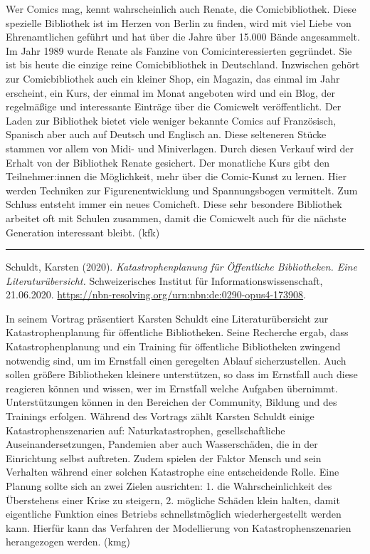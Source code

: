 \documentclass[a4paper,
fontsize=11pt,
oneside,
numbers=noperiodatend,
parskip=half-,
bibliography=totoc,
final
]{scrartcl}
\begin{document}
Wer Comics mag, kennt wahrscheinlich auch Renate, die Comicbibliothek.
Diese spezielle Bibliothek ist im Herzen von Berlin zu finden, wird mit
viel Liebe von Ehrenamtlichen geführt und hat über die Jahre über 15.000
Bände angesammelt. Im Jahr 1989 wurde Renate als Fanzine von
Comicinteressierten gegründet. Sie ist bis heute die einzige reine
Comicbibliothek in Deutschland. Inzwischen gehört zur Comicbibliothek
auch ein kleiner Shop, ein Magazin, das einmal im Jahr erscheint, ein
Kurs, der einmal im Monat angeboten wird und ein Blog, der regelmäßige
und interessante Einträge über die Comicwelt veröffentlicht. Der Laden
zur Bibliothek bietet viele weniger bekannte Comics auf Französisch,
Spanisch aber auch auf Deutsch und Englisch an. Diese selteneren Stücke
stammen vor allem von Midi- und Miniverlagen. Durch diesen Verkauf wird
der Erhalt von der Bibliothek Renate gesichert. Der monatliche Kurs gibt
den Teilnehmer:innen die Möglichkeit, mehr über die Comic-Kunst zu
lernen. Hier werden Techniken zur Figurenentwicklung und Spannungsbogen
vermittelt. Zum Schluss entsteht immer ein neues Comicheft. Diese sehr
besondere Bibliothek arbeitet oft mit Schulen zusammen, damit die
Comicwelt auch für die nächste Generation interessant bleibt. (kfk)

\begin{center}\rule{0.5\linewidth}{0.5pt}\end{center}

Schuldt, Karsten (2020). \emph{Katastrophenplanung für Öffentliche
Bibliotheken. Eine Literaturübersicht.} Schweizerisches Institut für
Informationswissenschaft, 21.06.2020.
\url{https://nbn-resolving.org/urn:nbn:de:0290-opus4-173908}.

In seinem Vortrag präsentiert Karsten Schuldt eine Literaturübersicht
zur Katastrophenplanung für öffentliche Bibliotheken. Seine Recherche
ergab, dass Katastrophenplanung und ein Training für öffentliche
Bibliotheken zwingend notwendig sind, um im Ernstfall einen geregelten
Ablauf sicherzustellen. Auch sollen größere Bibliotheken kleinere
unterstützen, so dass im Ernstfall auch diese reagieren können und
wissen, wer im Ernstfall welche Aufgaben übernimmt. Unterstützungen
können in den Bereichen der Community, Bildung und des Trainings
erfolgen. Während des Vortrags zählt Karsten Schuldt einige
Katastrophenszenarien auf: Naturkatastrophen, gesellschaftliche
Auseinandersetzungen, Pandemien aber auch Wasserschäden, die in der
Einrichtung selbst auftreten. Zudem spielen der Faktor Mensch und sein
Verhalten während einer solchen Katastrophe eine entscheidende Rolle.
Eine Planung sollte sich an zwei Zielen ausrichten: 1. die
Wahrscheinlichkeit des Überstehens einer Krise zu steigern, 2. mögliche
Schäden klein halten, damit eigentliche Funktion eines Betriebs
schnellstmöglich wiederhergestellt werden kann. Hierfür kann das
Verfahren der Modellierung von Katastrophenszenarien herangezogen werden. (kmg)
\end{document}
